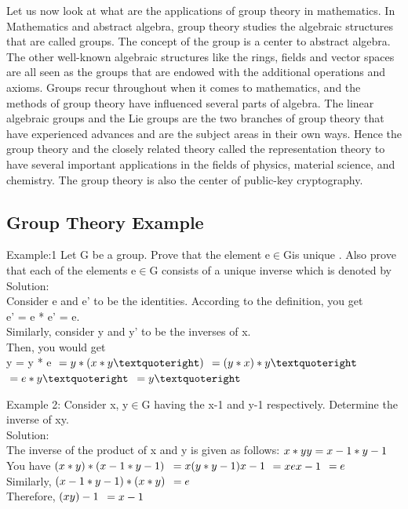 \documentclass[18pt,a4paper]{article}
\begin{document}
Let us now look at what are the applications of group theory in mathematics. In Mathematics and abstract algebra, group theory studies the algebraic structures that are called groups. The concept of the group is a center to abstract algebra. The other well-known algebraic structures like the rings, fields and vector spaces are all seen as the groups that are endowed with the additional operations and axioms. Groups recur throughout when it comes to mathematics, and the methods of group theory have influenced several parts of algebra. The linear algebraic groups and the Lie groups are the two branches of group theory that have experienced advances and are the subject areas in their own ways.
Hence the group theory and the closely related theory called the representation theory to have several important applications in the fields of physics, material science, and chemistry. The group theory is also the center of public-key cryptography.
\subsection{Group Theory Example}
 Example:1 Let G be a group.
 Prove that the element  e$ \in$Gis unique . Also  prove that each of the elements e$\in$G  consists of a unique inverse which is denoted by 
\\Solution: 
\\Consider e and e’ to be the identities. 
According to the definition,
 you get
\\ e' = e * e' = e.
\\Similarly, consider y and y' to be the inverses of x. 
\\Then, you would get
\\y = y * e
$\\ = y * (x * y’)$
$\\ = (y * x) * y’$
$\\= e * y’$
$\\= y’$


Example 2: Consider x,  y$\in$G having the x-1  and y-1   respectively. Determine the inverse of xy. 
\\Solution:
\\  The inverse of the product of x and y is given as follows:
$\\ x * yy = x-1 * y-1$
\\You have
$\\ (x * y) * (x-1 * y-1)$
$\\ = x (y * y-1) x-1$
$\\ = xex-1$
$\\ = e$
\\Similarly,
$\\ (x-1 * y-1) * (x * y)$
$\\= e$
\\Therefore,
$\\ (xy)-1$
$\\ = x-1$
\end{document}
